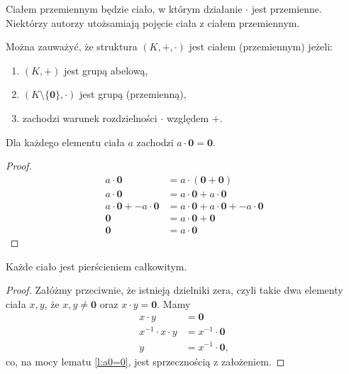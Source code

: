 \documentclass[11pt]{scrartcl}
\begin{document}
    Ciałem przemiennym będzie ciało, w którym działanie $\cdot$ jest przemienne. Niektórzy autorzy utożsamiają pojęcie ciała z ciałem przemiennym.

    Można zauważyć, że struktura $(K, +, \cdot)$ jest ciałem (przemiennym) jeżeli:
    \begin{enumerate}
        \item $(K, +)$ jest grupą abelową,
        \item $(K \setminus \{\mathbf{0}\}, \cdot)$ jest grupą (przemienną),
        \item zachodzi warunek rozdzielności $\cdot$ względem $+$.
    \end{enumerate}

    \begin{lemma}
        \label{l:a0=0}
        Dla każdego elementu ciała $a$ zachodzi $a \cdot \mathbf{0} = \mathbf{0}$.
    \end{lemma}
    \begin{proof}
        \begin{align*}             a \cdot \mathbf{0} &= a \cdot (\mathbf{0} + \mathbf{0}) \\
                                   a \cdot \mathbf{0} &= a \cdot \mathbf{0} + a \cdot \mathbf{0} \\
            a \cdot \mathbf{0} + - a \cdot \mathbf{0} &= a \cdot \mathbf{0} + a \cdot \mathbf{0} + - a \cdot \mathbf{0} \\
                                           \mathbf{0} &= a \cdot \mathbf{0} + \mathbf{0} \\
                                           \mathbf{0} &= a \cdot \mathbf{0}
        \end{align*}
    \end{proof}

    \begin{theorem}
        Każde ciało jest pierścieniem całkowitym.
    \end{theorem}
    \begin{proof}
        Załóżmy przeciwnie, że istnieją dzielniki zera, czyli takie dwa elementy ciała $x, y$, że $x, y \neq \mathbf{0}$ oraz $x \cdot y = \mathbf{0}$. Mamy
        \begin{align*}
            x \cdot y &= \mathbf{0} \\
            x^{-1} \cdot x \cdot y &= x^{-1} \cdot \mathbf{0} \\
            y &= x^{-1} \cdot \mathbf{0},
        \end{align*}
        co, na mocy lematu \ref{l:a0=0}, jest sprzecznością z założeniem.
    \end{proof}
\end{document}
